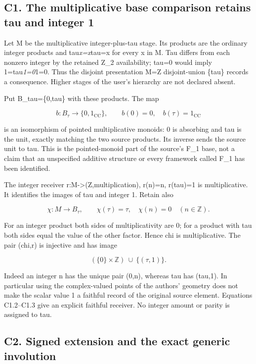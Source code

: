 \documentclass[
]{article}
\begin{document}
\subsection{C1. The multiplicative base comparison retains tau and
integer
1}\label{c1.-the-multiplicative-base-comparison-retains-tau-and-integer-1}

Let M be the multiplicative integer-plus-tau stage. Its products are the
ordinary integer products and tau\emph{x=x}tau=x for every x in M. Tau
differs from each nonzero integer by the retained Z\_2 availability;
tau=0 would imply 1=tau\emph{1=0}1=0. Thus the disjoint presentation M=Z
disjoint-union \{tau\} records a consequence. Higher stages of the
user's hierarchy are not declared absent.

Put B\_tau=\{0,tau\} with these products. The map

\[
b:B_\tau\longrightarrow\{0,1_{\mathrm{CC}}\},\qquad
b(0)=0,\quad b(\tau)=1_{\mathrm{CC}}
\tag{C1.1}
\]

is an isomorphism of pointed multiplicative monoids: 0 is absorbing and
tau is the unit, exactly matching the two source products. Its inverse
sends the source unit to tau. This is the pointed-monoid part of the
source's F\_1 base, not a claim that an unspecified additive structure
or every framework called F\_1 has been identified.

The integer receiver r:M-\textgreater(Z,multiplication), r(n)=n,
r(tau)=1 is multiplicative. It identifies the images of tau and integer
1. Retain also

\[
\chi:M\longrightarrow B_\tau,\qquad
\chi(\tau)=\tau,\quad \chi(n)=0\quad(n\in\mathbb Z).
\tag{C1.2}
\]

For an integer product both sides of multiplicativity are 0; for a
product with tau both sides equal the value of the other factor. Hence
chi is multiplicative. The pair (chi,r) is injective and has image

\[
(\{0\}\times\mathbb Z)\ \cup\ \{(\tau,1)\}.
\tag{C1.3}
\]

Indeed an integer n has the unique pair (0,n), whereas tau has (tau,1).
In particular using the complex-valued points of the authors' geometry
does not make the scalar value 1 a faithful record of the original
source element. Equations C1.2--C1.3 give an explicit faithful receiver.
No integer amount or parity is assigned to tau.

\subsection{C2. Signed extension and the exact generic
involution}\label{c2.-signed-extension-and-the-exact-generic-involution}
\end{document}
